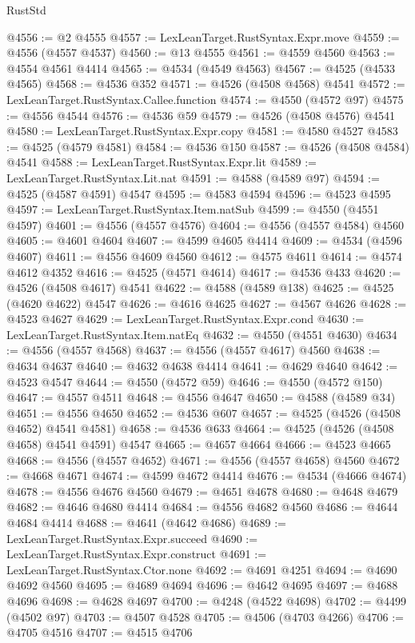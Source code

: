 \begin{lexlean}{RustStd}
\begin{coremodule}
@4556 := @2 @4555
@4557 := LexLeanTarget.RustSyntax.Expr.move
@4559 := @4556 (@4557 @4537)
@4560 := @13 @4555
@4561 := @4559 @4560
@4563 := @4554 @4561 @4414
@4565 := @4534 (@4549 @4563)
@4567 := @4525 (@4533 @4565)
@4568 := @4536 @352
@4571 := @4526 (@4508 @4568) @4541
@4572 := LexLeanTarget.RustSyntax.Callee.function
@4574 := @4550 (@4572 @97)
@4575 := @4556 @4544
@4576 := @4536 @59
@4579 := @4526 (@4508 @4576) @4541
@4580 := LexLeanTarget.RustSyntax.Expr.copy
@4581 := @4580 @4527
@4583 := @4525 (@4579 @4581)
@4584 := @4536 @150
@4587 := @4526 (@4508 @4584) @4541
@4588 := LexLeanTarget.RustSyntax.Expr.lit
@4589 := LexLeanTarget.RustSyntax.Lit.nat
@4591 := @4588 (@4589 @97)
@4594 := @4525 (@4587 @4591) @4547
@4595 := @4583 @4594
@4596 := @4523 @4595
@4597 := LexLeanTarget.RustSyntax.Item.natSub
@4599 := @4550 (@4551 @4597)
@4601 := @4556 (@4557 @4576)
@4604 := @4556 (@4557 @4584) @4560
@4605 := @4601 @4604
@4607 := @4599 @4605 @4414
@4609 := @4534 (@4596 @4607)
@4611 := @4556 @4609 @4560
@4612 := @4575 @4611
@4614 := @4574 @4612 @4352
@4616 := @4525 (@4571 @4614)
@4617 := @4536 @433
@4620 := @4526 (@4508 @4617) @4541
@4622 := @4588 (@4589 @138)
@4625 := @4525 (@4620 @4622) @4547
@4626 := @4616 @4625
@4627 := @4567 @4626
@4628 := @4523 @4627
@4629 := LexLeanTarget.RustSyntax.Expr.cond
@4630 := LexLeanTarget.RustSyntax.Item.natEq
@4632 := @4550 (@4551 @4630)
@4634 := @4556 (@4557 @4568)
@4637 := @4556 (@4557 @4617) @4560
@4638 := @4634 @4637
@4640 := @4632 @4638 @4414
@4641 := @4629 @4640
@4642 := @4523 @4547
@4644 := @4550 (@4572 @59)
@4646 := @4550 (@4572 @150)
@4647 := @4557 @4511
@4648 := @4556 @4647
@4650 := @4588 (@4589 @34)
@4651 := @4556 @4650
@4652 := @4536 @607
@4657 := @4525 (@4526 (@4508 @4652) @4541 @4581)
@4658 := @4536 @633
@4664 := @4525 (@4526 (@4508 @4658) @4541 @4591) @4547
@4665 := @4657 @4664
@4666 := @4523 @4665
@4668 := @4556 (@4557 @4652)
@4671 := @4556 (@4557 @4658) @4560
@4672 := @4668 @4671
@4674 := @4599 @4672 @4414
@4676 := @4534 (@4666 @4674)
@4678 := @4556 @4676 @4560
@4679 := @4651 @4678
@4680 := @4648 @4679
@4682 := @4646 @4680 @4414
@4684 := @4556 @4682 @4560
@4686 := @4644 @4684 @4414
@4688 := @4641 (@4642 @4686)
@4689 := LexLeanTarget.RustSyntax.Expr.succeed
@4690 := LexLeanTarget.RustSyntax.Expr.construct
@4691 := LexLeanTarget.RustSyntax.Ctor.none
@4692 := @4691 @4251
@4694 := @4690 @4692 @4560
@4695 := @4689 @4694
@4696 := @4642 @4695
@4697 := @4688 @4696
@4698 := @4628 @4697
@4700 := @4248 (@4522 @4698)
@4702 := @4499 (@4502 @97)
@4703 := @4507 @4528
@4705 := @4506 (@4703 @4266)
@4706 := @4705 @4516
@4707 := @4515 @4706

\end{coremodule}
\end{lexlean}
